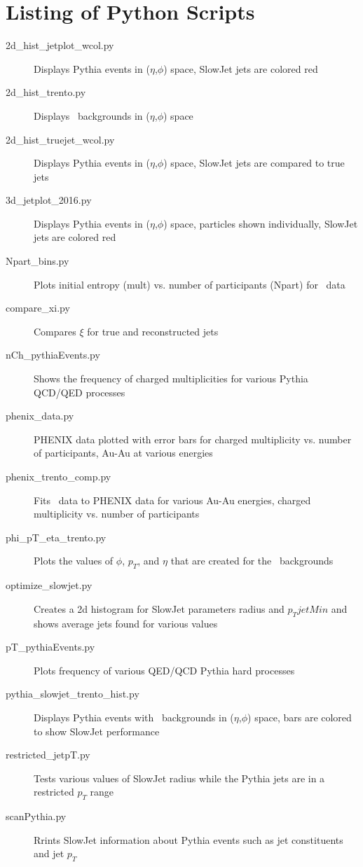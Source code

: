 \documentclass[11pt]{article}
\begin{document}
\appendix

\section{Listing of Python Scripts}
\begin{description}
\item[2d\_hist\_jetplot\_wcol.py] Displays Pythia events in ($\eta$,$\phi$) space, SlowJet jets are colored red
\item[2d\_hist\_trento.py] Displays \trento\ backgrounds in ($\eta$,$\phi$) space
\item[2d\_hist\_truejet\_wcol.py] Displays Pythia events in ($\eta$,$\phi$) space, SlowJet jets are compared to true jets
\item[3d\_jetplot\_2016.py] Displays Pythia events in ($\eta$,$\phi$) space, particles shown individually, SlowJet jets are colored red
\item[Npart\_bins.py] Plots initial entropy (mult) vs. number of participants (Npart) for \trento\ data
\item[compare\_xi.py] Compares $\xi$ for true and reconstructed jets
\item[nCh\_pythiaEvents.py] Shows the frequency of charged multiplicities for various Pythia QCD/QED processes
\item[phenix\_data.py] PHENIX data plotted with error bars for charged multiplicity vs. number of participants, Au-Au at various energies
\item[phenix\_trento\_comp.py] Fits \trento\ data to PHENIX data for various Au-Au energies, charged multiplicity vs. number of participants
\item[phi\_pT\_eta\_trento.py] Plots the values of $\phi$, $p_T$, and $\eta$ that are created for the \trento\ backgrounds
\item[optimize\_slowjet.py] Creates a 2d histogram for SlowJet parameters radius and $p_TjetMin$ and shows average jets found for various values
\item[pT\_pythiaEvents.py] Plots frequency of various QED/QCD Pythia hard processes
\item[pythia\_slowjet\_trento\_hist.py] Displays Pythia events with \trento\ backgrounds in ($\eta$,$\phi$) space, bars are colored to show SlowJet performance
\item[restricted\_jetpT.py] Tests various values of SlowJet radius while the Pythia jets are in a restricted $p_T$ range
\item[scanPythia.py] Rrints SlowJet information about Pythia events such as jet constituents and jet $p_T$

\end{description}
\end{document}
